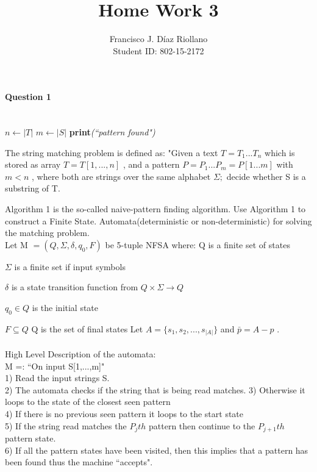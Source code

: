 \documentclass{report}
\title{Home Work 3}
\author{Francisco J. Díaz Riollano \\ Student ID: 802-15-2172 }
\newcommand{\me}[1]{
\begin{math}
#1
\end{math}
}
\begin{document}
\maketitle
\paragraph{\Large{Question 1\\ \\}}


\begin{algorithm}
  \begin{algorithmic}[1]
      \State $n\gets |T|$
      \State $m\gets |S|$
      	\State \textbf{print}\textit{(``pattern found")}
      \EndIf
      \EndFor     
    \EndProcedure
  \end{algorithmic}
\end{algorithm}


The string matching problem is defined as: "Given a text \me{T=T_1 ... T_n} which is stored as array \me{T= T[1,...,n]} , and a pattern \me{P = P_1 ... P_m = P[1...m]} with \me{m<n}, where both are strings over the same alphabet \me{\Sigma;}decide whether S is a substring of T.

Algorithm 1 is the so-called naive-pattern finding algorithm. Use Algorithm 1 to construct a Finite State. Automata(deterministic or non-deterministic) for solving the matching problem. 
\\

Let M \me{=(Q,\Sigma,\delta,q_0,F)} be 5-tuple NFSA where: \newline
Q is a finite set of states \newline
\me{\Sigma} is a finite set if input symbols \newline
\me{\delta} is a state transition function from \me{Q \times \Sigma \rightarrow Q} \newline
\me{q_0 \in Q} is the initial state \newline
\me{F \subseteq Q} Q is the set of final states \newline
Let \me{A=\{s_1,s_2,...,s_{|A|}\}} and \me{\bar{p} = A -p}.
\\
\\
High Level Description of the automata: \\
M =: ``On input S[1,...,m]" \\
1) Read the input strings S. \\
2) The automata checks if the string that is being read matches.
3) Otherwise it loops to the state of the closest seen pattern \\
4) If there is no previous seen pattern it loops to the start state\\
5) If the string read matches the $P_jth$ pattern then continue to the $P_{j+1}th$ pattern state.\\
6) If all the pattern states have been visited, then this implies that a pattern has been found thus the machine ``accepts".\\
\end{document}
